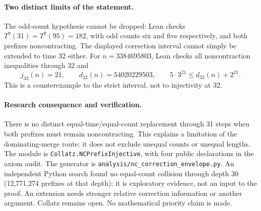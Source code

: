 \documentclass[10pt]{article}
\begin{document}
\paragraph{Two distinct limits of the statement.}
The odd-count hypothesis cannot be dropped: Lean checks
$T^7(31)=T^7(95)=182$, with odd counts six and five respectively,
and both prefixes noncontracting. The displayed correction interval
cannot simply be extended to time 32 either. For $n=3384695803$, Lean
checks all noncontraction inequalities through 32 and
\[
j_{32}(n)=21,\qquad d_{32}(n)=54020229503,\qquad
5\cdot3^{21}\leq d_{32}(n)+2^{21}.
\]
This is a counterexample to the strict interval, not to injectivity at 32.

\paragraph{Research consequence and verification.}
There is no distinct equal-time/equal-count replacement through 31 steps
when both prefixes must remain noncontracting. This explains a limitation
of the dominating-merge route; it does not exclude unequal counts or
unequal lengths. The module is \texttt{Collatz.NCPrefixInjective}, with four
public declarations in the axiom audit. The generator is
\texttt{analysis/nc\_correction\_envelope.py}. An independent Python search
found no equal-count collision through depth 30 (12,771,274 prefixes at
that depth); it is exploratory evidence, not an input to the proof.
An extension needs stronger relative correction information or another
argument. Collatz remains open. No mathematical priority claim is made.
\end{document}
